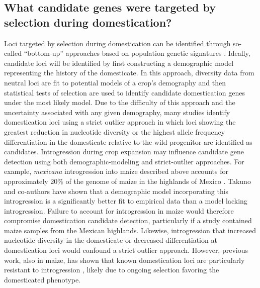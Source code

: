\documentclass[11pt]{article}
\newcommand{\lwang}[1]{\textcolor{red}{ \emph{\scriptsize  #1}} } %
\newcommand{\gmj}[1]{\textcolor{blue}{ \emph{\scriptsize  #1}} } %
\begin{document}
\subsection*{What candidate genes were targeted by selection during domestication?}
Loci targeted by selection during domestication can be identified through so-called ``bottom-up'' approaches based on population genetic signatures \cite{Ross-Ibarra2007}.
Ideally, candidate loci will be identified by first constructing a demographic model representing the history of the domesticate.
In this approach, diversity data from neutral loci are fit to potential models of a crop's demography and then statistical tests of selection are used to identify candidate domestication genes under the most likely model.
Due to the difficulty of this approach and the uncertainty associated with any given demography, many studies identify domestication loci using a strict outlier approach in which loci showing the greatest reduction in nucleotide diversity or the highest allele frequency differentiation in the domesticate relative to the wild progenitor are identified as candidates.
Introgression during crop expansion may influence candidate gene detection using both demographic-modeling and strict-outlier approaches.
For example, \emph{mexicana} introgression into maize described above accounts for approximately 20\% of the genome of maize in the highlands of Mexico \cite{vanHeerwaarden2011}.
Takuno and co-authors \cite{Takuno2015} have shown that a demographic model incorporating this introgression is a significantly better fit to empirical data than a model lacking introgression.
Failure to account for introgression in maize would therefore compromise domestication candidate detection, particularly if a study contained maize samples from the Mexican highlands.
Likewise, introgression that increased nucleotide diversity in the domesticate or decreased differentiation at domestication loci would confound a strict outlier approach.
However, previous work, also in maize, has shown that known domestication loci are particularly resistant to introgression \cite{hufford2013genomic}, likely due to ongoing selection favoring the domesticated phenotype.

\end{document}
